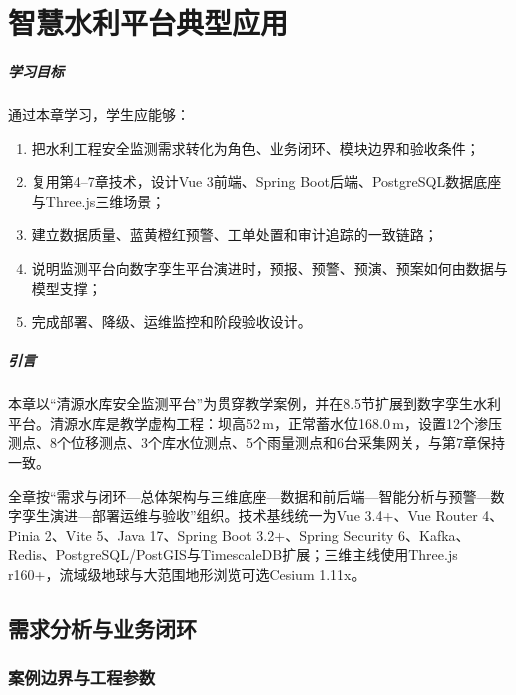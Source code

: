 \chapter{智慧水利平台典型应用}


\paragraph*{学习目标}

通过本章学习，学生应能够：

\begin{enumerate}
\item 把水利工程安全监测需求转化为角色、业务闭环、模块边界和验收条件；
\item 复用第4--7章技术，设计Vue 3前端、Spring Boot后端、PostgreSQL数据底座与Three.js三维场景；
\item 建立数据质量、蓝黄橙红预警、工单处置和审计追踪的一致链路；
\item 说明监测平台向数字孪生平台演进时，预报、预警、预演、预案如何由数据与模型支撑；
\item 完成部署、降级、运维监控和阶段验收设计。
\end{enumerate}

\paragraph*{引言}

本章以“清源水库安全监测平台”为贯穿教学案例，并在8.5节扩展到数字孪生水利平台。清源水库是教学虚构工程：坝高52\,m，正常蓄水位168.0\,m，设置12个渗压测点、8个位移测点、3个库水位测点、5个雨量测点和6台采集网关，与第7章保持一致。

全章按“需求与闭环—总体架构与三维底座—数据和前后端—智能分析与预警—数字孪生演进—部署运维与验收”组织。技术基线统一为Vue 3.4+、Vue Router 4、Pinia 2、Vite 5、Java 17、Spring Boot 3.2+、Spring Security 6、Kafka、Redis、PostgreSQL/PostGIS与TimescaleDB扩展；三维主线使用Three.js r160+，流域级地球与大范围地形浏览可选Cesium 1.11x。

\section{需求分析与业务闭环}

\subsection{案例边界与工程参数}

